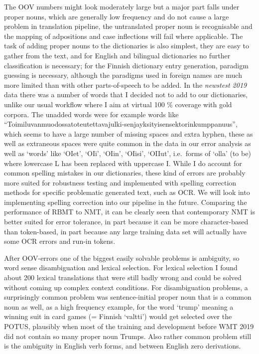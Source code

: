 \documentclass[free]{flammie}
\begin{document}
The OOV numbers might look moderately large but a major part falls under proper
nouns, which are generally low frequency and do not cause a large problem in
translation pipeline, the untranslated proper noun is recognisable and the
mapping of adpositions and case inflections will fail where applicable. The task
of adding proper nouns to the dictionaries is also simplest, they are easy to
gather from the text, and for English and bilingual dictionaries no further
classification is necessary; for the Finnish dictionary entry generation,
paradigm guessing is necessary, although the paradigms used in foreign names are
much more limited than with other parts-of-speech to be added. In the
\textit{newstest 2019} data there was a number of words that I decided not to
add to our dictionaries, unlike our usual workflow where I aim at virtual 100
\% coverage with gold corpora. The unadded words were for example words like
``Toimiluvanmuodossatoteutettavajulki-senjayksityisensektorinkumppanuus'', which
seems to have a large number of missing spaces and extra hyphen, these as well
as extraneous spaces were quite common in the data in our error analysis as well
as `words' like `OIet', `OIi', `OIin', `OIisi', `OIIut', i.e.\ forms of `olla'
(to be) where lowercase L has been replaced with uppercase I. While I do
account for common spelling mistakes in our dictionaries, these kind of errors
are probably more suited for robustness testing and implemented with spelling
correction methods for specific problematic generated text, such as OCR\@.  We
will look into implementing spelling correction into our pipeline in the
future. Comparing the performance of RBMT to NMT, it can be clearly seen that
contemporary NMT is better suited for error tolerance, in part because it can
be more character-based than token-based, in part because any large training
data set will actually have some OCR errors and run-in tokens.

After OOV-errors one of the biggest easily solvable problems is ambiguity, so
word sense disambiguation and lexical selection. For lexical selection I found
about 200 lexical translations that were still badly wrong and could be solved
without coming up complex context conditions. For disambiguation problems, a
surprisingly common problem was sentence-initial proper noun that is a common
noun as well, as a high frequency example, for the word `trump' meaning a
winning suit in card games (= Finnish `valtti') would get selected over the
POTUS, plausibly when most of the training and development before WMT 2019 did
not contain so many proper noun Trumps. Also rather common problem still is the
ambiguity in English verb forms, and between English zero derivations.
\end{document}
